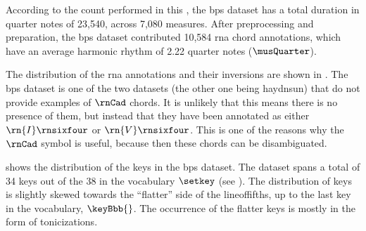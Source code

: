 
According to the count performed in this \thesisdiss{}, the
\gls{bps} dataset has a total duration in quarter notes of
23,540, across 7,080 measures. After preprocessing and
preparation, the \gls{bps} dataset contributed 10,584
\gls{rna} chord annotations, which have an average harmonic
rhythm of 2.22 quarter notes ($\musQuarter$).

The distribution of the \gls{rna} annotations and their
inversions are shown in . The
\gls{bps} dataset is one of the two datasets (the other one
being \gls{haydnsun}) that do not provide examples of
$\rnCad$ chords. It is unlikely that this means there is no
presence of them, but instead that they have been annotated
as either $\rn{I}\rnsixfour$ or $\rn{V}\rnsixfour$. This is
one of the reasons why the $\rnCad$ symbol is useful,
because then these chords can be disambiguated.



 shows the distribution of the keys
in the \gls{bps} dataset. The dataset spans a total of 34
keys out of the 38 in the vocabulary $\setkey$ (see
). The distribution of
keys is slightly skewed towards the ``flatter'' side of the
\gls{lineoffifths}, up to the last key in the vocabulary,
$\keyBbb{}$. The occurrence of the flatter keys is mostly in
the form of tonicizations. 
